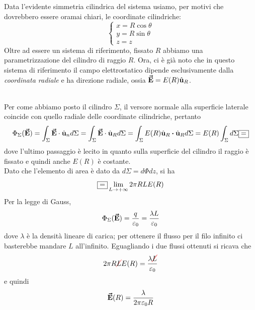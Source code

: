 	\begin{minipage}{0.7\textwidth}
		Data l'evidente simmetria cilindrica del sistema usiamo, per motivi che dovrebbero essere oramai chiari, le coordinate cilindriche:
		\begin{equation*}
			\begin{cases}
				x=R\cos\theta\\
				y=R\sin\theta\\
				z=z
			\end{cases}
		\end{equation*}
		Oltre ad essere un sistema di riferimento, fissato $R$ abbiamo una parametrizzazione del cilindro di raggio $R$. Ora, ci è già noto che in questo sistema di riferimento il campo elettrostatico dipende esclusivamente dalla \textit{coordinata radiale} e ha direzione radiale, ossia $\vb*{\va{E}}=E(R)\hat{\mathbf{u}}_R$.
	\end{minipage}\\
Per come abbiamo posto il cilindro $\Sigma$, il versore normale alla superficie laterale coincide con quello radiale delle coordinate cilindriche, pertanto
\begin{equation*}
	\Phi_{\Sigma}(\vba{E})=\int_{\Sigma}\vba{E}\cdot\vbh{u}_nd\Sigma=\int_{\Sigma}\vba{E}\cdot\vbh{u}_Rd\Sigma=\int_{\Sigma} E(R)\vbh{u}_R\vdot\vbh{u}_Rd\Sigma=E(R)\int_{\Sigma} d\Sigma\squarequal
\end{equation*}
dove l'ultimo passaggio è lecito in quanto sulla superficie del cilindro il raggio è fissato e quindi anche $E(R)$ è costante.\\
Dato che l'elemento di area è dato da $d\Sigma=d\Phi dz$, si ha
\begin{equation*}
	\squarequal\lim_{L\to+\infty}2\pi R L E(R)
\end{equation*}
Per la legge di Gauss,
\begin{equation*}
	\Phi_{\Sigma}(\vb*{\va{E}})=\frac{q}{\varepsilon_0}=\frac{\lambda L}{\varepsilon_0}
\end{equation*}
dove $\lambda$ è la densità lineare di carica; per ottenere il flusso per il filo infinito ci basterebbe mandare $L$ all'infinito. Eguagliando i due flussi ottenuti si ricava che
\begin{equation*}
	2\pi R\Ccancel[red]{L}E(R)=\frac{\lambda \Ccancel[red]{L}}{\epsilon_0}
\end{equation*}
e quindi
\begin{equation}
	\vb*{\va{E}}(R)=\frac{\lambda}{2\pi\varepsilon_0 R}
\end{equation}
